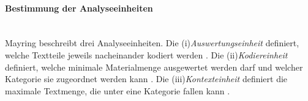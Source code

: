 \paragraph{Bestimmung der Analyseeinheiten}\mbox{} \\
Mayring beschreibt drei Analyseeinheiten. Die (i)\emph{Auswertungseinheit} definiert, welche Textteile jeweils nacheinander kodiert werden \cite{mayring1994qualitative}. Die (ii)\emph{Kodiereinheit} definiert, welche minimale Materialmenge ausgewertet werden darf und welcher Kategorie sie zugeordnet werden kann \cite{mayring1994qualitative}. Die (iii)\emph{Kontexteinheit} definiert die maximale Textmenge, die unter eine Kategorie fallen kann \cite{mayring1994qualitative}.
%	
